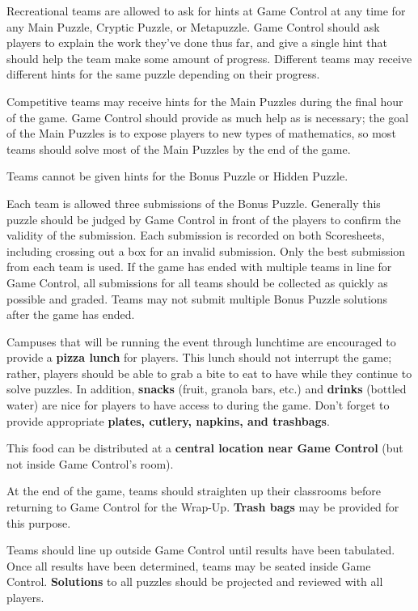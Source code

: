 Recreational teams are allowed to ask for hints at Game Control at any time
for any Main Puzzle, Cryptic Puzzle, or Metapuzzle. Game Control should ask
players to explain the work they've
done thus far, and give a single hint that should help the team make some
amount of progress. Different teams may receive different hints for the same
puzzle depending on their progress.

Competitive teams may receive hints for the Main Puzzles during the final
hour of the game. Game Control should provide as much help as is necessary;
the goal of the Main Puzzles is to expose players to new types of mathematics,
so most teams should solve most of the Main Puzzles by the end of the game.

Teams cannot be given hints for the Bonus Puzzle or Hidden Puzzle.

Each team is allowed three submissions of the Bonus Puzzle. Generally this
puzzle should be judged by Game Control in front of the players to confirm
the validity of the submission. Each submission is recorded on both
Scoresheets, including crossing out a box for an invalid submission.
Only the best submission from each team is used. If the game has ended
with multiple teams in line for Game Control, all submissions for all teams
should be collected as quickly as possible and graded. Teams may not submit
multiple Bonus Puzzle solutions after the game has ended.


Campuses that will be running the event through lunchtime are encouraged to
provide a \textbf{pizza lunch} for players. This lunch should not interrupt the
game; rather, players should be able to grab a bite to eat to have while they
continue to solve puzzles. In addition, \textbf{snacks}
(fruit, granola bars, etc.) and \textbf{drinks} (bottled water) are nice for
players to have access to during the game. Don't forget to provide
appropriate \textbf{plates, cutlery, napkins, and trashbags}.

This food can be distributed at a \textbf{central location near Game Control}
(but not inside Game Control's room).


At the end of the game, teams should straighten up their classrooms before
returning to Game Control for the Wrap-Up. \textbf{Trash bags} may be
provided for this purpose.

Teams should line up outside Game Control until results have been tabulated.
Once all results have been determined, teams may be seated inside Game Control.
\textbf{Solutions} to all puzzles should be projected and reviewed with
all players.

